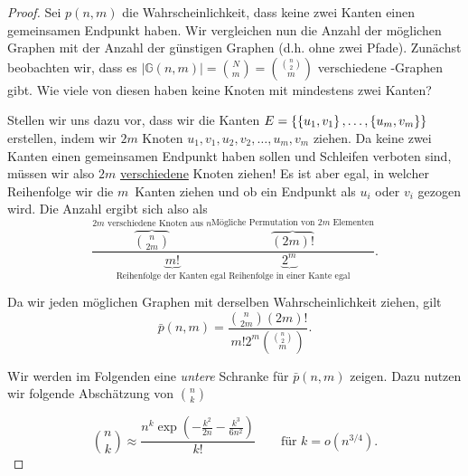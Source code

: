 \begin{proof}
    Sei $p(n,m)$ die Wahrscheinlichkeit, dass keine zwei Kanten einen gemeinsamen Endpunkt haben.
    Wir vergleichen nun die Anzahl der möglichen Graphen mit der Anzahl der günstigen Graphen (d.h. ohne zwei Pfade).
    Zunächst beobachten wir, dass es $|\mathbb G(n,m)| = \binom N m = \binom{\binom n 2}{m}$ verschiedene \Gnm-Graphen gibt.
    Wie viele von diesen haben keine Knoten mit mindestens zwei Kanten?

    Stellen wir uns dazu vor, dass wir die Kanten $E = \left\{\left\{u_1, v_1\right\}, \ldots, \left\{u_m, v_m\right\}\right\}$ erstellen, indem wir $2m$ Knoten $u_1, v_1, u_2, v_2, \ldots, u_m, v_m$ ziehen.
    Da keine zwei Kanten einen gemeinsamen Endpunkt haben sollen und Schleifen verboten sind, müssen wir also $2m$ \underline{verschiedene} Knoten ziehen!
    Es ist aber egal, in welcher Reihenfolge wir die $m$~Kanten ziehen und ob ein Endpunkt als $u_i$ oder $v_i$ gezogen wird.
    Die Anzahl ergibt sich also als
    \begin{equation}
        \frac{
            \overbrace{\binom{n}{2m}}^\text{$2m$ verschiedene Knoten aus $n$}
            \overbrace{(2m)!}^\text{Mögliche Permutation von $2m$ Elementen}
        }{
            \underbrace{m!}_\text{Reihenfolge der Kanten egal\ \ \ }
            \underbrace{2^m}_\text{Reihenfolge in einer Kante egal}
        }.
    \end{equation}

    \noindent
    Da wir jeden möglichen Graphen mit derselben Wahrscheinlichkeit ziehen, gilt
    \begin{equation}
        \bar p(n, m) = \frac{\binom{n}{2m} (2m)!}{m! 2^m \binom{\binom n 2}{m}}. \label{eq:wkeit_keine_zwei_kanten}
    \end{equation}

    \noindent
    Wir werden im Folgenden eine \emph{untere} Schranke für $\bar p(n,m)$ zeigen.
    Dazu nutzen wir folgende Abschätzung von $\binom n k$

    \begin{equation}
        \binom n k \approx \frac{n^k \exp\left(-\frac{k^2}{2n} - \frac{k^3}{6n^2}\right)}{k!}
        \quad\quad \text{für } k = o(n^{3/4}).
    \end{equation}


\end{proof}
